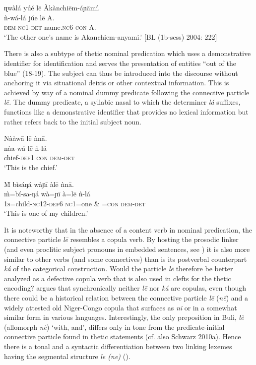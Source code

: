\documentclass[output=paper]{langsci/langscibook}
\begin{document}
\ea
\glll \textup{}  ɳwàlá     yúé    l\={e}   Àkànchi\={e}m-áɲ\={a}mí.\\
  \textup{  ǹ}\textup{{}-wá-lá   júe    l\={e}   A.}\\
     \textsc{  }\textsc{dem}{}-\textsc{nc}1-\textsc{det  }name\textsc{.nc}6  \textsc{con}  A.\\
\glt ‘The other one’s name is Akanchiem-anyami.’ [BL (1b-sess) 2004: 222]
\z

There is also a subtype of thetic nominal predication which uses a demonstrative identifier for identification and serves the presentation of entities “out of the blue” (18-19). The subject can thus be introduced into the discourse without anchoring it via situational deixis or other contextual information. This is achieved by way of a nominal dummy predicate following the connective particle \textit{l\={e}. }The dummy predicate, a syllabic nasal to which the determiner \textit{lá }suffixes\textit{, }functions like a demonstrative identifier that provides no lexical information but rather refers back to the initial subject noun.

\ea
\glll \textup{}  Nààw\={a}    l\={e}  ǹn\={a}.\\
  \textup{  nàa-wá    l\={e}  ǹ-lá}\\
       chief-\textsc{def1}  \textsc{con}  \textsc{dem}{}-\textsc{det}\\
\glt ‘This is the chief.’ \citep[88]{Schwarz2007}
\z

\ea
\glll \textup{}  \`{M}   bìsáŋá    wàɲ\={i}    àl\={e}    ǹn\={a}.\\
  \textup{  \`{m}=bí-sa-ŋá    wà=ɲ\={i}    à=l\={e}    ǹ-lá}\\
       1\textsc{s}=child-\textsc{nc}12-\textsc{def}6  \textsc{nc}1=one  \& =\textsc{con}  \textsc{dem-det}\\
\glt ‘This is one of my children.’ \citep[88]{Schwarz2007}
\z

It is noteworthy that in the absence of a content verb in nominal predication, the connective particle \textit{l\={e}} resembles a copula verb. By hosting the prosodic linker (and even proclitic subject pronouns in embedded sentences, see ) it is also more similar to other verbs (and some connectives) than is its postverbal counterpart \textit{ká }of the categorical construction\textit{. }Would the particle \textit{l\={e} }therefore be better analyzed as a defective copula verb that is also used in clefts for the thetic encoding? \citet{Schwarz2009} argues that synchronically neither \textit{l\={e} }nor \textit{ká} are copulas, even though there could be a historical relation between the connective particle \textit{l\={e} }(\textit{n\={e}}) and a widely attested old Niger-Congo copula that surfaces as \textit{ni }or in a somewhat similar form in various languages. Interestingly, the only preposition in Buli, \textit{lè }(allomorph \textit{nè}) ‘with, and’, differs only in tone from the predicate-initial connective particle found in thetic statements (cf. also Schwarz 2010a). Hence there is a tonal and a syntactic differentiation between two linking lexemes having the segmental structure \textit{le (ne) }().
\end{document}
